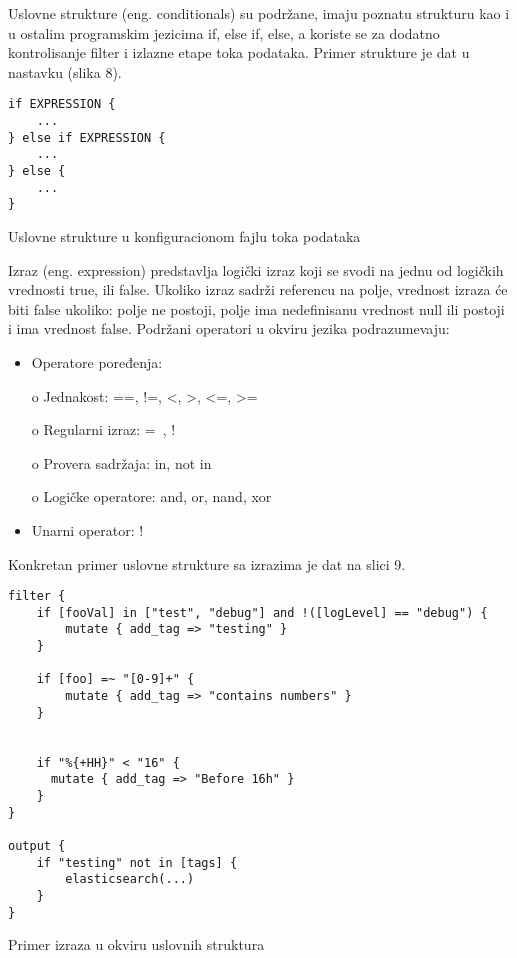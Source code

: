 \par
Uslovne strukture (eng. conditionals) su podržane, imaju poznatu strukturu kao i u ostalim programskim jezicima if, else if, else, a koriste se za dodatno kontrolisanje filter i izlazne etape toka podataka. Primer strukture je dat u nastavku (slika 8).
\begin{listing}[H]
\begin{verbatim}
if EXPRESSION {
    ...
} else if EXPRESSION {
    ...
} else {
    ...
}
\end{verbatim}
\caption{Uslovne strukture u konfiguracionom fajlu toka podataka}
\label{code:Uslovne-strukture-u-konfiguracionom-fajlu-toka-podataka}
\end{listing}

\par
Izraz (eng. expression) predstavlja logički izraz koji se svodi na jednu od logičkih vrednosti true, ili false. Ukoliko izraz sadrži referencu na polje, vrednost izraza će biti false ukoliko: polje ne postoji, polje ima nedefinisanu vrednost null ili postoji i ima vrednost false. Podržani operatori u okviru jezika podrazumevaju:
\begin{itemize}
\item Operatore poređenja:
\item[o] Jednakost: ==, !=, <, >, <=, >=
\item[o] Regularni izraz: =~, !~
\item[o] Provera sadržaja: in, not in
\item[o] Logičke operatore: and, or, nand, xor
\item Unarni operator: !
\end{itemize}

\par
Konkretan primer uslovne strukture sa izrazima je dat na slici 9.
\begin{listing}[H]
\begin{verbatim}
filter {
    if [fooVal] in ["test", "debug"] and !([logLevel] == "debug") {
        mutate { add_tag => "testing" }
    }
	
	if [foo] =~ "[0-9]+" {
        mutate { add_tag => "contains numbers" }
    }


    if "%{+HH}" < "16" {
      mutate { add_tag => "Before 16h" }
    }    
}

output {
    if "testing" not in [tags] {
        elasticsearch(...)
    }
}
\end{verbatim}
\caption{Primer izraza u okviru uslovnih struktura}
\label{code:primer-izraza-u-okviru-uslovnih-struktura}
\end{listing}

